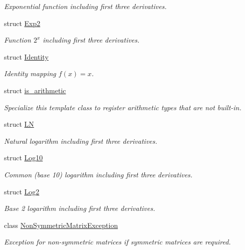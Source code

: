 \begin{DoxyCompactItemize}
\begin{DoxyCompactList}\small\item\em Exponential function including first three derivatives. \end{DoxyCompactList}\item 
struct \hyperlink{structFunG_1_1Exp2}{Exp2}
\begin{DoxyCompactList}\small\item\em Function $2^x$ including first three derivatives. \end{DoxyCompactList}\item 
struct \hyperlink{structFunG_1_1Identity}{Identity}
\begin{DoxyCompactList}\small\item\em Identity mapping $ f(x)=x $. \end{DoxyCompactList}\item 
struct \hyperlink{structFunG_1_1is__arithmetic}{is\+\_\+arithmetic}
\begin{DoxyCompactList}\small\item\em Specialize this template class to register arithmetic types that are not built-\/in. \end{DoxyCompactList}\item 
struct \hyperlink{structFunG_1_1LN}{LN}
\begin{DoxyCompactList}\small\item\em Natural logarithm including first three derivatives. \end{DoxyCompactList}\item 
struct \hyperlink{structFunG_1_1Log10}{Log10}
\begin{DoxyCompactList}\small\item\em Common (base 10) logarithm including first three derivatives. \end{DoxyCompactList}\item 
struct \hyperlink{structFunG_1_1Log2}{Log2}
\begin{DoxyCompactList}\small\item\em Base 2 logarithm including first three derivatives. \end{DoxyCompactList}\item 
class \hyperlink{classFunG_1_1NonSymmetricMatrixException}{Non\+Symmetric\+Matrix\+Exception}
\begin{DoxyCompactList}\small\item\em Exception for non-\/symmetric matrices if symmetric matrices are required. \end{DoxyCompactList}\item 

\end{DoxyCompactItemize}

